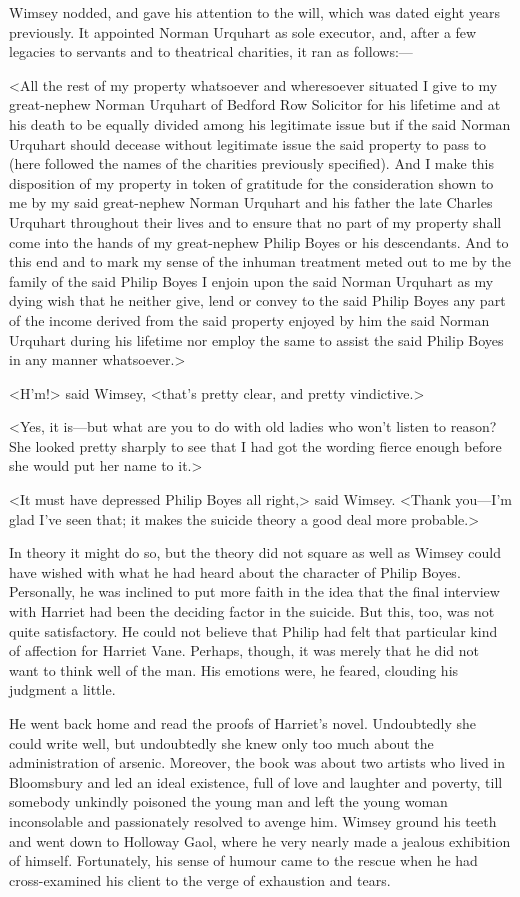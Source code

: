 Wimsey nodded, and gave his attention to the will, which was dated eight years previously. It appointed Norman Urquhart as sole executor, and, after a few legacies to servants and to theatrical charities, it ran as follows:—

<All the rest of my property whatsoever and wheresoever situated I give to my great-nephew Norman Urquhart of Bedford Row Solicitor for his lifetime and at his death to be equally divided among his legitimate issue but if the said Norman Urquhart should decease without legitimate issue the said property to pass to (here followed the names of the charities previously specified). And I make this disposition of my property in token of gratitude for the consideration shown to me by my said great-nephew Norman Urquhart and his father the late Charles Urquhart throughout their lives and to ensure that no part of my property shall come into the hands of my great-nephew Philip Boyes or his descendants. And to this end and to mark my sense of the inhuman treatment meted out to me by the family of the said Philip Boyes I enjoin upon the said Norman Urquhart as my dying wish that he neither give, lend or convey to the said Philip Boyes any part of the income derived from the said property enjoyed by him the said Norman Urquhart during his lifetime nor employ the same to assist the said Philip Boyes in any manner whatsoever.>

<H'm!> said Wimsey, <that's pretty clear, and pretty vindictive.>

<Yes, it is—but what are you to do with old ladies who won't listen to reason? She looked pretty sharply to see that I had got the wording fierce enough before she would put her name to it.>

<It must have depressed Philip Boyes all right,> said Wimsey. <Thank you—I'm glad I've seen that; it makes the suicide theory a good deal more probable.>

In theory it might do so, but the theory did not square as well as Wimsey could have wished with what he had heard about the character of Philip Boyes. Personally, he was inclined to put more faith in the idea that the final interview with Harriet had been the deciding factor in the suicide. But this, too, was not quite satisfactory. He could not believe that Philip had felt that particular kind of affection for Harriet Vane. Perhaps, though, it was merely that he did not want to think well of the man. His emotions were, he feared, clouding his judgment a little.

He went back home and read the proofs of Harriet's novel. Undoubtedly she could write well, but undoubtedly she knew only too much about the administration of arsenic. Moreover, the book was about two artists who lived in Bloomsbury and led an ideal existence, full of love and laughter and poverty, till somebody unkindly poisoned the young man and left the young woman inconsolable and passionately resolved to avenge him. Wimsey ground his teeth and went down to Holloway Gaol, where he very nearly made a jealous exhibition of himself. Fortunately, his sense of humour came to the rescue when he had cross-examined his client to the verge of exhaustion and tears.

